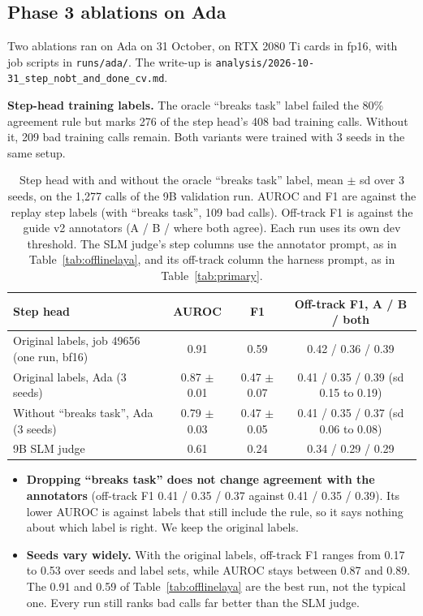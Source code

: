 \documentclass[10.5pt,a4paper]{article}
\newcommand{\tablestyle}{\small\rowcolors{2}{rowshade}{white}}
\newcommand{\code}[1]{\texttt{#1}}
\begin{document}
\subsection{Phase 3 ablations on Ada}
Two ablations ran on Ada on 31 October, on RTX 2080 Ti cards in fp16, with job scripts in \code{runs/ada/}. The write-up is \code{analysis/2026-10-31\_step\_nobt\_and\_done\_cv.md}.

\textbf{Step-head training labels.} The oracle ``breaks task'' label failed the 80\% agreement rule but marks 276 of the step head's 408 bad training calls. Without it, 209 bad training calls remain. Both variants were trained with 3 seeds in the same setup.

\begin{table}[H]
\centering\tablestyle
\caption{Step head with and without the oracle ``breaks task'' label, mean $\pm$ sd over 3 seeds, on the 1,277 calls of the 9B validation run. AUROC and F1 are against the replay step labels (with ``breaks task'', 109 bad calls). Off-track F1 is against the guide v2 annotators (A / B / where both agree). Each run uses its own dev threshold. The SLM judge's step columns use the annotator prompt, as in Table~\ref{tab:offlinelaya}, and its off-track column the harness prompt, as in Table~\ref{tab:primary}.}\label{tab:phase3}
\begin{tabularx}{\linewidth}{Yccc}
\toprule
{}\textbf{Step head} & \textbf{AUROC} & \textbf{F1} & \textbf{Off-track F1, A / B / both} \\
\midrule
Original labels, job 49656 (one run, bf16) & 0.91 & 0.59 & 0.42 / 0.36 / 0.39 \\
Original labels, Ada (3 seeds) & 0.87 $\pm$ 0.01 & 0.47 $\pm$ 0.07 & 0.41 / 0.35 / 0.39 (sd 0.15 to 0.19) \\
Without ``breaks task'', Ada (3 seeds) & 0.79 $\pm$ 0.03 & 0.47 $\pm$ 0.05 & 0.41 / 0.35 / 0.37 (sd 0.06 to 0.08) \\
9B SLM judge & 0.61 & 0.24 & 0.34 / 0.29 / 0.29 \\
\bottomrule
\end{tabularx}
\end{table}

\begin{itemize}
  \item \textbf{Dropping ``breaks task'' does not change agreement with the annotators} (off-track F1 0.41 / 0.35 / 0.37 against 0.41 / 0.35 / 0.39). Its lower AUROC is against labels that still include the rule, so it says nothing about which label is right. We keep the original labels.
  \item \textbf{Seeds vary widely.} With the original labels, off-track F1 ranges from 0.17 to 0.53 over seeds and label sets, while AUROC stays between 0.87 and 0.89. The 0.91 and 0.59 of Table~\ref{tab:offlinelaya} are the best run, not the typical one. Every run still ranks bad calls far better than the SLM judge.
\end{itemize}
\end{document}
